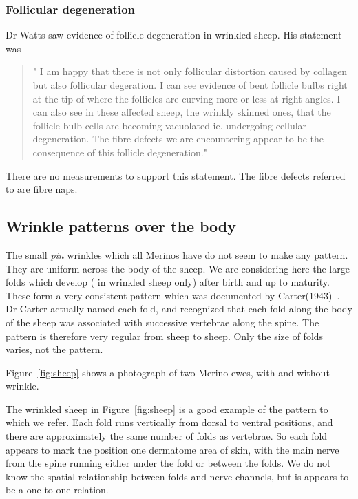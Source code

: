 \documentclass[titlepage]{article}  %
\begin{document}
\subsubsection{Follicular degeneration}
Dr Watts saw evidence of follicle degeneration in wrinkled sheep. His statement was
\begin{quote}
"  I am happy that there is not only follicular distortion caused by collagen but also follicular degeration.  I can see evidence of bent follicle bulbs right at the tip of where the follicles are curving more or less at right angles.  I can also see in these affected sheep, the wrinkly skinned ones, that the follicle bulb cells are becoming vacuolated ie. undergoing cellular degeneration. The fibre defects we are encountering appear to be the consequence of this follicle degeneration."
\end{quote}

There are no measurements to support this statement. The fibre defects referred to are fibre naps. 

\subsection{Wrinkle patterns over the body}
The small {\em pin} wrinkles which all Merinos have do not seem to make any pattern. They are uniform across the body of the sheep. We are considering here the large folds which develop ( in wrinkled sheep only) after birth and up to maturity. These form a very consistent pattern which was documented by Carter(1943)~\cite{cart:43}. Dr Carter actually named each fold, and recognized that each fold along the body of the sheep was associated with successive vertebrae along the spine. The pattern is therefore very regular from sheep to sheep. Only the size of folds varies, not the pattern.

Figure~\ref{fig:sheep} shows a photograph of two Merino ewes, with and without wrinkle. 

The wrinkled sheep in Figure~\ref{fig:sheep} is a good example of the pattern to which we refer.  Each fold runs vertically from dorsal to ventral positions, and there are approximately the same number of folds as vertebrae. So each fold appears to mark the position one dermatome area of skin, with the main nerve from the spine running either under the fold or between the folds. We do not know the spatial relationship between folds and nerve channels, but is appears to be a one-to-one relation.


\clearpage
\end{document}
